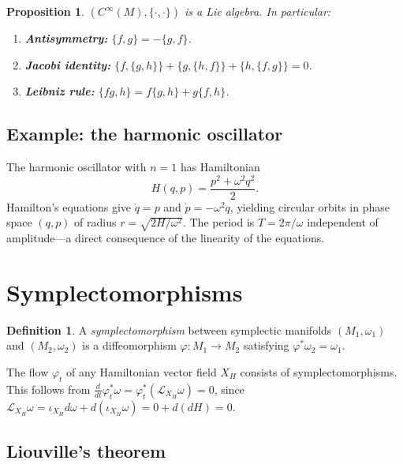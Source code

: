 \documentclass[12pt,a4paper]{amsart}
\newtheorem{proposition}[theorem]{Proposition}
\theoremstyle{definition}
\newtheorem{definition}[theorem]{Definition}
\begin{document}
\begin{proposition}
$(C^\infty(M), \{\cdot,\cdot\})$ is a Lie algebra.  In particular:
\begin{enumerate}[label=(\roman*)]
  \item \textbf{Antisymmetry:} $\{f,g\} = -\{g,f\}$.
  \item \textbf{Jacobi identity:} $\{f,\{g,h\}\} + \{g,\{h,f\}\} + \{h,\{f,g\}\} = 0$.
  \item \textbf{Leibniz rule:} $\{fg, h\} = f\{g,h\} + g\{f,h\}$.
\end{enumerate}
\end{proposition}

\subsection{Example: the harmonic oscillator}

The harmonic oscillator with $n = 1$ has Hamiltonian
\[
  H(q, p) = \frac{p^2 + \omega^2 q^2}{2}.
\]
Hamilton's equations give $\dot{q} = p$ and $\dot{p} = -\omega^2 q$, yielding
circular orbits in phase space $(q, p)$ of radius
$r = \sqrt{2H/\omega^2}$.  The period is $T = 2\pi/\omega$ independent of
amplitude---a direct consequence of the linearity of the equations.

\section{Symplectomorphisms}
\label{sec:symplecto}

\begin{definition}
A \emph{symplectomorphism} between symplectic manifolds $(M_1, \omega_1)$ and
$(M_2, \omega_2)$ is a diffeomorphism $\varphi: M_1 \to M_2$ satisfying
$\varphi^* \omega_2 = \omega_1$.
\end{definition}

The flow $\varphi_t$ of any Hamiltonian vector field $X_H$ consists of
symplectomorphisms.  This follows from
$\frac{d}{dt}\varphi_t^*\omega = \varphi_t^*(\mathcal{L}_{X_H}\omega) = 0$,
since $\mathcal{L}_{X_H}\omega = \iota_{X_H}d\omega + d(\iota_{X_H}\omega)
= 0 + d(dH) = 0$.

\subsection{Liouville's theorem}
\end{document}
